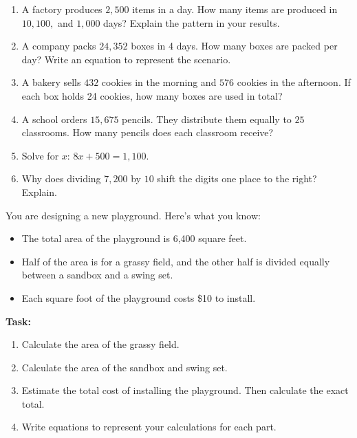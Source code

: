 \documentclass[12pt]{article}
\begin{document}
\begin{tcolorbox}[colframe=black!60, colback=white, 
coltitle=black, colbacktitle=black!15, fonttitle=\bfseries\Large, 
title=Problems, halign title=center, left=10pt, right=10pt, top=10pt, bottom=100pt]
\begin{enumerate}[start=9, itemsep=5em]
    \item A factory produces \( 2,500 \) items in a day. How many items are produced in \( 10, 100, \) and \( 1,000 \) days? Explain the pattern in your results.
    \item A company packs \( 24,352 \) boxes in 4 days. How many boxes are packed per day? Write an equation to represent the scenario.
   
    \item A bakery sells \( 432 \) cookies in the morning and \( 576 \) cookies in the afternoon. If each box holds 24 cookies, how many boxes are used in total?
    \item A school orders \( 15,675 \) pencils. They distribute them equally to \( 25 \) classrooms. How many pencils does each classroom receive?
    \item Solve for \( x \): \( 8x + 500 = 1,100 \).
    \item Why does dividing \( 7,200 \) by \( 10 \) shift the digits one place to the right? Explain.
\end{enumerate}
\end{tcolorbox}

\vspace{1em}

\begin{tcolorbox}[colframe=black!60, colback=white, 
coltitle=black, colbacktitle=black!15, fonttitle=\bfseries\Large, 
title=Performance Task: Designing a Playground, halign title=center, left=10pt, right=10pt, top=10pt, bottom=50pt]
You are designing a new playground. Here’s what you know:
\begin{itemize}
    \item The total area of the playground is 6,400 square feet.
    \item Half of the area is for a grassy field, and the other half is divided equally between a sandbox and a swing set.
    \item Each square foot of the playground costs \$10 to install.
\end{itemize}
\textbf{Task:}
\begin{enumerate}[itemsep=4em]
    \item Calculate the area of the grassy field.
    \item Calculate the area of the sandbox and swing set.
    \item Estimate the total cost of installing the playground. Then calculate the exact total.
    \item Write equations to represent your calculations for each part.
    \vspace{2cm}
\end{enumerate}
\end{tcolorbox}
\end{document}

